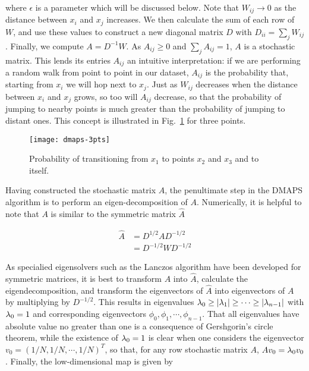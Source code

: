 where $\epsilon$ is a parameter which will be discussed below. Note
that $W_{ij} \rightarrow 0$ as the distance between $x_i$ and $x_j$
increases. We then calculate the sum of each row of $W$, and use these
values to construct a new diagonal matrix $D$ with
$D_{ii} = \sum_j W_{ij}$. Finally, we compute $A = D^{-1} W$. As
$A_{ij} \ge 0$ and $\sum_j A_{ij} = 1$, $A$ is a stochastic
matrix. This lends its entries $A_{ij}$ an intuitive interpretation:
if we are performing a random walk from point to point in our dataset,
$A_{ij}$ is the probability that, starting from $x_i$ we will hop next
to $x_j$. Just as $W_{ij}$ decreases when the distance between $x_i$
and $x_j$ grows, so too will $A_{ij}$ decrease, so that the
probability of jumping to nearby points is much greater than the
probability of jumping to distant ones. This concept is illustrated in
Fig.~\ref{fig:dmaps-3pts} for three points.

\begin{figure}
  \centering
  \texttt{[image: dmaps-3pts]}
  \caption{Probability of transitioning from $x_1$ to points $x_2$ and
    $x_3$ and to itself. \label{fig:dmaps-3pts}}
\end{figure}


Having constructed the stochastic matrix $A$, the penultimate step in
the DMAPS algorithm is to perform an eigen-decomposition of
$A$. Numerically, it is helpful to note that $A$ is similar to the
symmetric matrix $\hat{A}$

\begin{align}
  \hat{A} &= D^{1/2}A D^{-1/2} \\
  & = D^{-1/2} W D^{-1/2}
\end{align}

As specialied eigensolvers such as the Lanczos algorithm have been
developed for symmetric matrices, it is best to transform $A$ into
$\hat{A}$, calculate the eigendecomposition, and transform the
eigenvectors of $\hat{A}$ into eigenvectors of $A$ by multiplying by
$D^{-1/2}$. This results in eigenvalues
$\lambda_0 \ge |\lambda_1| \ge \cdots \ge |\lambda_{n-1}|$ with $\lambda_0 = 1$ and
corresponding eigenvectors $\phi_0, \phi_1, \cdots, \phi_{n-1}$. That
all eigenvalues have absolute value no greater than one is a
consequence of Gershgorin's circle theorem, while the existence of
$\lambda_0 = 1$ is clear when one considers the eigenvector $v_0 = (1/N,
1/N, \cdots, 1/N)^T$, so that, for any row stochastic matrix $A$, $A
v_0 = \lambda_0 v_0$. Finally, the low-dimensional map is given by

